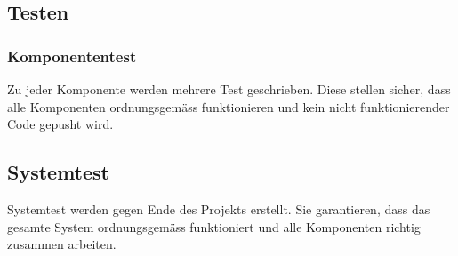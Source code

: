 \documentclass[11pt]{scrartcl}
\begin{document}
\subsection{Testen}
\label{sec:Testen}
\subsubsection{Komponententest}
\label{sec:Komponententest}
Zu jeder Komponente werden mehrere Test geschrieben. Diese stellen sicher, dass alle Komponenten ordnungsgemäss funktionieren und kein nicht funktionierender Code gepusht wird.
\subsection{Systemtest}
\label{sec:Systemtest}
Systemtest werden gegen Ende des Projekts erstellt. Sie garantieren, dass das gesamte System ordnungsgemäss funktioniert und alle Komponenten richtig zusammen arbeiten.
\end{document}
